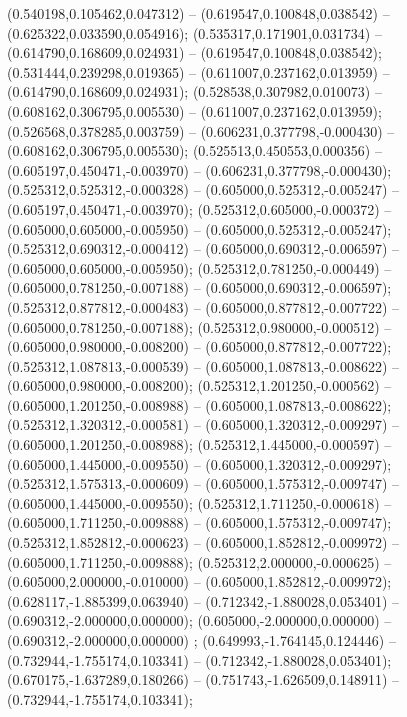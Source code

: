  (0.540198,0.105462,0.047312) -- (0.619547,0.100848,0.038542) -- (0.625322,0.033590,0.054916);
 (0.535317,0.171901,0.031734) -- (0.614790,0.168609,0.024931) -- (0.619547,0.100848,0.038542);
 (0.531444,0.239298,0.019365) -- (0.611007,0.237162,0.013959) -- (0.614790,0.168609,0.024931);
 (0.528538,0.307982,0.010073) -- (0.608162,0.306795,0.005530) -- (0.611007,0.237162,0.013959);
 (0.526568,0.378285,0.003759) -- (0.606231,0.377798,-0.000430) -- (0.608162,0.306795,0.005530);
 (0.525513,0.450553,0.000356) -- (0.605197,0.450471,-0.003970) -- (0.606231,0.377798,-0.000430);
 (0.525312,0.525312,-0.000328) -- (0.605000,0.525312,-0.005247) -- (0.605197,0.450471,-0.003970);
 (0.525312,0.605000,-0.000372) -- (0.605000,0.605000,-0.005950) -- (0.605000,0.525312,-0.005247);
 (0.525312,0.690312,-0.000412) -- (0.605000,0.690312,-0.006597) -- (0.605000,0.605000,-0.005950);
 (0.525312,0.781250,-0.000449) -- (0.605000,0.781250,-0.007188) -- (0.605000,0.690312,-0.006597);
 (0.525312,0.877812,-0.000483) -- (0.605000,0.877812,-0.007722) -- (0.605000,0.781250,-0.007188);
 (0.525312,0.980000,-0.000512) -- (0.605000,0.980000,-0.008200) -- (0.605000,0.877812,-0.007722);
 (0.525312,1.087813,-0.000539) -- (0.605000,1.087813,-0.008622) -- (0.605000,0.980000,-0.008200);
 (0.525312,1.201250,-0.000562) -- (0.605000,1.201250,-0.008988) -- (0.605000,1.087813,-0.008622);
 (0.525312,1.320312,-0.000581) -- (0.605000,1.320312,-0.009297) -- (0.605000,1.201250,-0.008988);
 (0.525312,1.445000,-0.000597) -- (0.605000,1.445000,-0.009550) -- (0.605000,1.320312,-0.009297);
 (0.525312,1.575313,-0.000609) -- (0.605000,1.575312,-0.009747) -- (0.605000,1.445000,-0.009550);
 (0.525312,1.711250,-0.000618) -- (0.605000,1.711250,-0.009888) -- (0.605000,1.575312,-0.009747);
 (0.525312,1.852812,-0.000623) -- (0.605000,1.852812,-0.009972) -- (0.605000,1.711250,-0.009888);
 (0.525312,2.000000,-0.000625) -- (0.605000,2.000000,-0.010000) -- (0.605000,1.852812,-0.009972);
 (0.628117,-1.885399,0.063940) -- (0.712342,-1.880028,0.053401) -- (0.690312,-2.000000,0.000000);
 (0.605000,-2.000000,0.000000) -- (0.690312,-2.000000,0.000000) ;
 (0.649993,-1.764145,0.124446) -- (0.732944,-1.755174,0.103341) -- (0.712342,-1.880028,0.053401);
 (0.670175,-1.637289,0.180266) -- (0.751743,-1.626509,0.148911) -- (0.732944,-1.755174,0.103341);
